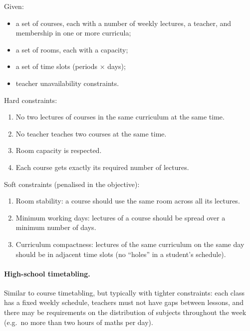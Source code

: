 \begin{definition}
\label{def:cb-ctt}
Given:
\begin{itemize}[nosep]
  \item a set of courses, each with a number of weekly lectures,
        a teacher, and membership in one or more curricula;
  \item a set of rooms, each with a capacity;
  \item a set of time slots (periods $\times$ days);
  \item teacher unavailability constraints.
\end{itemize}
Hard constraints:
\begin{enumerate}[nosep]
  \item[H1.] No two lectures of courses in the same curriculum
             at the same time.
  \item[H2.] No teacher teaches two courses at the same time.
  \item[H3.] Room capacity is respected.
  \item[H4.] Each course gets exactly its required number of
             lectures.
\end{enumerate}
Soft constraints (penalised in the objective):
\begin{enumerate}[nosep]
  \item[S1.] Room stability: a course should use the same room
             across all its lectures.
  \item[S2.] Minimum working days: lectures of a course should
             be spread over a minimum number of days.
  \item[S3.] Curriculum compactness: lectures of the same
             curriculum on the same day should be in adjacent
             time slots (no ``holes'' in a student's schedule).
\end{enumerate}
\end{definition}

\paragraph{High-school timetabling.}
Similar to course timetabling, but typically with tighter
constraints: each class has a fixed weekly schedule, teachers
must not have gaps between lessons, and there may be requirements
on the distribution of subjects throughout the week
(e.g.\ no more than two hours of maths per day).

